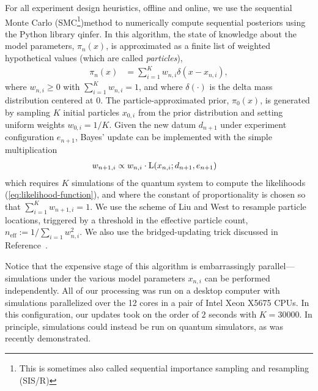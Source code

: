 \documentclass[aps,nofootinbib,twocolumn,superscriptaddress]{revtex4}
\newcommand{\mps}{x}
\newcommand{\eps}{e}
\newcommand{\data}{d}
\begin{document}
For all experiment design heuristics, offline and online, 
we use the sequential Monte Carlo (SMC\footnote{This is
sometimes also called sequential importance sampling and resampling (SIS/R)})\citeneed method to numerically compute sequential posteriors
using the Python library qinfer\cite{granade_qinfer:_2017}.
In this algorithm, the state of knowledge about the model 
parameters, $\pi_n(\mps)$, 
is approximated as a finite list of weighted hypothetical values
(which are called \textit{particles}),
\begin{align}
    \pi_n(\mps) 
        &= \sum_{i=1}^{K}w_{n,i} \delta(\mps-\mps_{n,i}),
    \label{eq:particle-approximation}
\end{align}
where $w_{n,i}\geq 0$ with $\sum_{i=1}^K w_{n,i}=1$, and where
$\delta(\cdot)$ is the delta mass distribution centered at $0$.
The particle-approximated prior, $\pi_0(\mps)$, is generated by 
sampling $K$ initial particles $\mps_{0,i}$ from the prior distribution
and setting uniform weights $w_{0,i}=1/K$.
Given the new datum $\data_{n+1}$ under experiment 
configuration $\eps_{n+1}$,
Bayes' update can be implemented with the simple multiplication 
\begin{align}
    w_{n+1,i}
        &\propto w_{n,i}\cdot \Lhood(\mps_{n,i};\data_{n+1},\eps_{n+1})
    \label{eq:particle-update}
\end{align}
which requires $K$ simulations of the quantum system to
compute the likelihoods (\autoref{eq:likelihood-function}), and where
the constant of proportionality is chosen so that 
$\sum_{i=1}^K w_{n+1,i}=1$.
We use the scheme of Liu and West to resample particle locations, 
triggered by a threshold in the effective particle count,
$n_\text{eff}:=1/\sum_{i=1} w_{n,i}^2$.
We also use the bridged-updating trick discussed in
Reference~\cite{hincks_statistical_2018}.

Notice that the expensive stage of this algorithm is 
embarrassingly parallel---simulations under the various
model parameters $\mps_{n,i}$ can be performed independently.
All of our processing was run on a desktop computer with simulations
parallelized over the 12 cores in a pair of Intel Xeon X5675 CPUs.
In this configuration, our updates took on the order of $2$ seconds
with $K=30000$.
In principle, simulations could instead be run on quantum simulators, 
as was recently demonstrated\cite{wang_experimental_2017}.
\end{document}
